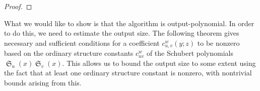 \documentclass{amsart}
\theoremstyle{definition}
\theoremstyle{remark}
\numberwithin{equation}{section}
\DeclareMathOperator{\sch}{\mathfrak{S}}
\newcommand{\code}{\mathfrak{c}}
\begin{document}
\begin{proof}
\end{proof}

What we would like to show is that the algorithm is output-polynomial. In order to do this, we need to estimate the output size. The following theorem gives necessary and sufficient conditions for a coefficient $c_{u,v}^w(y;z)$ to be nonzero based on the ordinary structure constants $c_{uv}^w$ of the Schubert polynomials $\sch_u(x)\sch_v(x)$. This allows us to bound the output size to some extent using the fact that at least one ordinary structure constant is nonzero, with nontrivial bounds arising from this.
\end{document}
